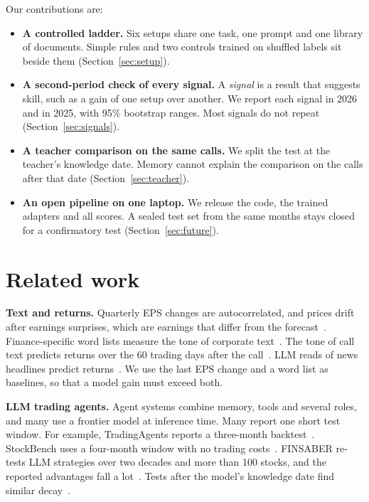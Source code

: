 \documentclass[sigconf,nonacm]{acmart}
\begin{document}
Our contributions are:
\begin{itemize}
\item \textbf{A controlled ladder.} Six setups share one task, one prompt and one library of documents. Simple rules and two controls trained on shuffled labels sit beside them (Section~\ref{sec:setup}).
\item \textbf{A second-period check of every signal.} A \emph{signal} is a result that suggests skill, such as a gain of one setup over another. We report each signal in 2026 and in 2025, with 95\% bootstrap ranges. Most signals do not repeat (Section~\ref{sec:signals}).
\item \textbf{A teacher comparison on the same calls.} We split the test at the teacher's knowledge date. Memory cannot explain the comparison on the calls after that date (Section~\ref{sec:teacher}).
\item \textbf{An open pipeline on one laptop.} We release the code, the trained adapters and all scores. A sealed test set from the same months stays closed for a confirmatory test (Section~\ref{sec:future}).
\end{itemize}

\section{Related work}

\textbf{Text and returns.}
Quarterly EPS changes are autocorrelated, and prices drift after earnings surprises, which are earnings that differ from the forecast~\cite{bernardthomas1990}.
Finance-specific word lists measure the tone of corporate text~\cite{loughranmcdonald2011}.
The tone of call text predicts returns over the 60 trading days after the call~\cite{price2012}.
LLM reads of news headlines predict returns~\cite{lopezliratang2023}.
We use the last EPS change and a word list as baselines, so that a model gain must exceed both.

\textbf{LLM trading agents.}
Agent systems combine memory, tools and several roles, and many use a frontier model at inference time.
Many report one short test window.
For example, TradingAgents reports a three-month backtest~\cite{xiao2024tradingagents}.
StockBench uses a four-month window with no trading costs~\cite{chen2025stockbench}.
FINSABER re-tests LLM strategies over two decades and more than 100 stocks, and the reported advantages fall a lot~\cite{li2025finsaber}.
Tests after the model's knowledge date find similar decay~\cite{li2025profitmirage}.
\end{document}
